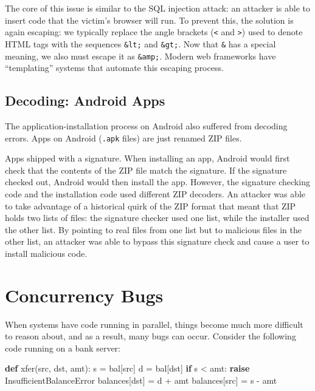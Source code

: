 \documentclass[
  letterpaper,
]{scrbook}
\newenvironment{Shaded}{\begin{snugshade}}{\end{snugshade}}
\newcommand{\ControlFlowTok}[1]{\textcolor[rgb]{0.00,0.23,0.31}{\textbf{#1}}}
\newcommand{\KeywordTok}[1]{\textcolor[rgb]{0.00,0.23,0.31}{\textbf{#1}}}
\newcommand{\NormalTok}[1]{\textcolor[rgb]{0.00,0.23,0.31}{#1}}
\newcommand{\OperatorTok}[1]{\textcolor[rgb]{0.37,0.37,0.37}{#1}}
\theoremstyle{definition}
\theoremstyle{plain}
\theoremstyle{plain}
\theoremstyle{remark}
\begin{document}
The core of this issue is similar to the SQL injection attack: an
attacker is able to insert code that the victim's browser will run. To
prevent this, the solution is again escaping: we typically replace the
angle brackets (\texttt{\textless{}} and \texttt{\textgreater{}}) used
to denote HTML tags with the sequences \texttt{\&lt;} and
\texttt{\&gt;}. Now that \texttt{\&} has a special meaning, we also must
escape it as \texttt{\&amp;}. Modern web frameworks have ``templating''
systems that automate this escaping process.

\subsection{Decoding: Android Apps}\label{decoding-android-apps}

The application-installation process on Android also suffered from
decoding errors. Apps on Android (\texttt{.apk} files) are just renamed
ZIP files.

Apps shipped with a signature. When installing an app, Android would
first check that the contents of the ZIP file match the signature. If
the signature checked out, Android would then install the app. However,
the signature checking code and the installation code used different ZIP
decoders. An attacker was able to take advantage of a historical quirk
of the ZIP format that meant that ZIP holds two lists of files: the
signature checker used one list, while the installer used the other
list. By pointing to real files from one list but to malicious files in
the other list, an attacker was able to bypass this signature check and
cause a user to install malicious code.

\section{Concurrency Bugs}\label{concurrency-bugs}

When systems have code running in parallel, things become much more
difficult to reason about, and as a result, many bugs can occur.
Consider the following code running on a bank server:

\begin{Shaded}
\begin{Highlighting}[]
\KeywordTok{def}\NormalTok{ xfer(src, dst, amt):}
\NormalTok{    s }\OperatorTok{=}\NormalTok{ bal[src]}
\NormalTok{    d }\OperatorTok{=}\NormalTok{ bal[dst]}
    \ControlFlowTok{if}\NormalTok{ s }\OperatorTok{\textless{}}\NormalTok{ amt:}
        \ControlFlowTok{raise}\NormalTok{ InsufficientBalanceError}
\NormalTok{    balances[dst] }\OperatorTok{=}\NormalTok{ d }\OperatorTok{+}\NormalTok{ amt}
\NormalTok{    balances[src] }\OperatorTok{=}\NormalTok{ s }\OperatorTok{{-}}\NormalTok{ amt}
\end{Highlighting}
\end{Shaded}
\end{document}
